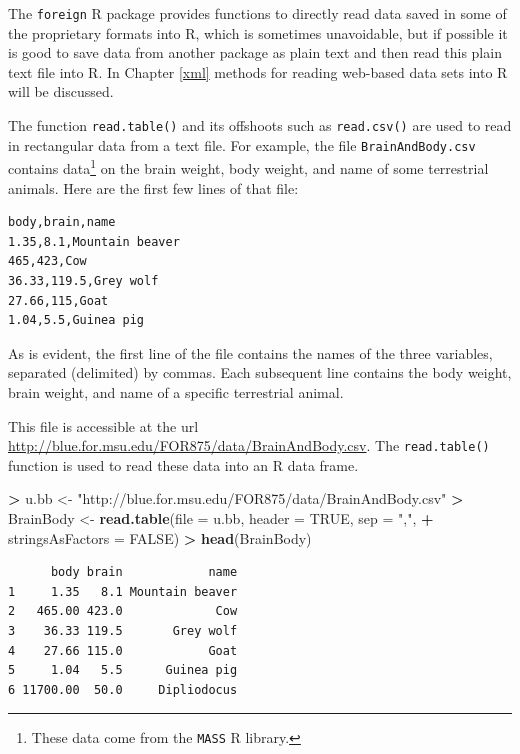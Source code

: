 \documentclass[]{krantz}
\makeatletter
\newenvironment{Shaded}{\begin{snugshade}}{\end{snugshade}}
\newcommand{\KeywordTok}[1]{\textcolor[rgb]{0.27,0.27,0.27}{\textbf{#1}}}
\newcommand{\DataTypeTok}[1]{\textcolor[rgb]{0.27,0.27,0.27}{#1}}
\newcommand{\StringTok}[1]{\textcolor[rgb]{0.5,0.5,0.5}{#1}}
\newcommand{\OtherTok}[1]{\textcolor[rgb]{0.37,0.37,0.37}{#1}}
\newcommand{\OperatorTok}[1]{\textcolor[rgb]{0.43,0.43,0.43}{\textbf{#1}}}
\newcommand{\NormalTok}[1]{#1}
\newenvironment{kframe}{%
\medskip{}
\setlength{\fboxsep}{.8em}
 \def\at@end@of@kframe{}%
 \ifinner\ifhmode%
  \def\at@end@of@kframe{\end{minipage}}%
  \begin{minipage}{\columnwidth}%
 \fi\fi%
 \def\FrameCommand##1{\hskip\@totalleftmargin \hskip-\fboxsep
 \colorbox{shadecolor}{##1}\hskip-\fboxsep
     \hskip-\linewidth \hskip-\@totalleftmargin \hskip\columnwidth}%
 \MakeFramed {\advance\hsize-\width
   \@totalleftmargin\z@ \linewidth\hsize
   \@setminipage}}%
 {\par\unskip\endMakeFramed%
 \at@end@of@kframe}
\renewenvironment{Shaded}{\begin{kframe}}{\end{kframe}}
\makeatother
\begin{document}
The \texttt{foreign} R package provides functions to directly read data
saved in some of the proprietary formats into R, which is sometimes
unavoidable, but if possible it is good to save data from another
package as plain text and then read this plain text file into R. In
Chapter \ref{xml} methods for reading web-based data sets into R will be
discussed.

The function \texttt{read.table()} and its offshoots such as
\texttt{read.csv()} are used to read in rectangular data from a text
file. For example, the file \texttt{BrainAndBody.csv} contains
data\footnote{These data come from the \texttt{MASS} R library.} on the
brain weight, body weight, and name of some terrestrial animals. Here
are the first few lines of that file:

\begin{verbatim}
body,brain,name
1.35,8.1,Mountain beaver
465,423,Cow
36.33,119.5,Grey wolf
27.66,115,Goat
1.04,5.5,Guinea pig
\end{verbatim}

As is evident, the first line of the file contains the names of the
three variables, separated (delimited) by commas. Each subsequent line
contains the body weight, brain weight, and name of a specific
terrestrial animal.

This file is accessible at the url
\url{http://blue.for.msu.edu/FOR875/data/BrainAndBody.csv}. The
\texttt{read.table()} function is used to read these data into an R data
frame.

\begin{Shaded}
\begin{Highlighting}[]
\OperatorTok{>}\StringTok{ }\NormalTok{u.bb <-}\StringTok{ "http://blue.for.msu.edu/FOR875/data/BrainAndBody.csv"}
\OperatorTok{>}\StringTok{ }\NormalTok{BrainBody <-}\StringTok{ }\KeywordTok{read.table}\NormalTok{(}\DataTypeTok{file =}\NormalTok{ u.bb, }\DataTypeTok{header =} \OtherTok{TRUE}\NormalTok{, }\DataTypeTok{sep =} \StringTok{","}\NormalTok{, }
\OperatorTok{+}\StringTok{                         }\DataTypeTok{stringsAsFactors =} \OtherTok{FALSE}\NormalTok{)}
\OperatorTok{>}\StringTok{ }\KeywordTok{head}\NormalTok{(BrainBody)}
\end{Highlighting}
\end{Shaded}

\begin{verbatim}
      body brain            name
1     1.35   8.1 Mountain beaver
2   465.00 423.0             Cow
3    36.33 119.5       Grey wolf
4    27.66 115.0            Goat
5     1.04   5.5      Guinea pig
6 11700.00  50.0     Dipliodocus
\end{verbatim}
\end{document}

